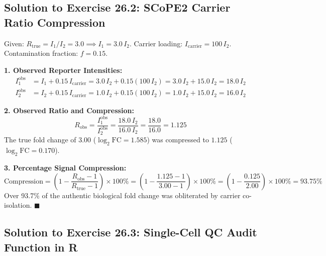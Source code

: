 \documentclass[11pt,twoside,openright]{book}
\begin{document}
\subsection*{Solution to Exercise 26.2: SCoPE2 Carrier Ratio Compression}

Given: $R_{\text{true}} = I_1 / I_2 = 3.0 \implies I_1 = 3.0 \, I_2$. Carrier loading: $I_{\text{carrier}} = 100 \, I_2$. Contamination fraction: $f = 0.15$.

\textbf{1. Observed Reporter Intensities:}\\
\begin{align}
I_1^{\text{obs}} &= I_1 + 0.15 \, I_{\text{carrier}} = 3.0 \, I_2 + 0.15(100 \, I_2) = 3.0 \, I_2 + 15.0 \, I_2 = 18.0 \, I_2 \\
I_2^{\text{obs}} &= I_2 + 0.15 \, I_{\text{carrier}} = 1.0 \, I_2 + 0.15(100 \, I_2) = 1.0 \, I_2 + 15.0 \, I_2 = 16.0 \, I_2
\end{align}

\textbf{2. Observed Ratio and Compression:}\\
\begin{equation}
R_{\text{obs}} = \frac{I_1^{\text{obs}}}{I_2^{\text{obs}}} = \frac{18.0 \, I_2}{16.0 \, I_2} = \frac{18.0}{16.0} = 1.125
\end{equation}
The true fold change of $3.00$ ($\log_2 \text{FC} = 1.585$) was compressed to $1.125$ ($\log_2 \text{FC} = 0.170$).

\textbf{3. Percentage Signal Compression:}\\
\begin{equation}
\text{Compression} = \left( 1 - \frac{R_{\text{obs}} - 1}{R_{\text{true}} - 1} \right) \times 100\% = \left( 1 - \frac{1.125 - 1}{3.00 - 1} \right) \times 100\% = \left( 1 - \frac{0.125}{2.00} \right) \times 100\% = 93.75\%
\end{equation}
Over 93.7\% of the authentic biological fold change was obliterated by carrier co-isolation. \hfill $\blacksquare$

\subsection*{Solution to Exercise 26.3: Single-Cell QC Audit Function in R}
\end{document}
